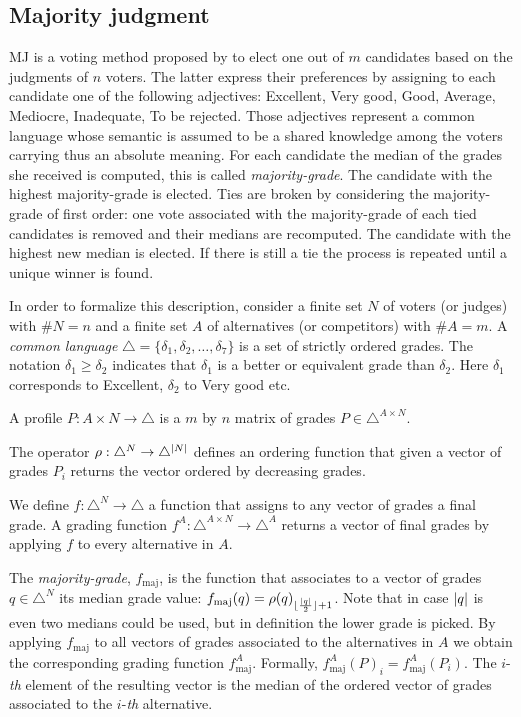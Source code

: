 
\subsection*{Majority judgment}
	\label{sec:MJ}
	\ac{MJ} is a voting method proposed by \citet{Balinski2007,Balinski2011} to elect one out of $m$ candidates based on the judgments of $n$ voters. The latter express their preferences by assigning to each candidate one of the following adjectives: Excellent, Very good, Good, Average, Mediocre, Inadequate, To be rejected. Those adjectives represent a common language whose semantic is assumed to be a shared knowledge among the voters carrying thus an absolute meaning. For each candidate the median of the grades she received is computed, this is called \textit{majority-grade}. The candidate with the highest majority-grade is elected. Ties are broken by considering the majority-grade of first order: one vote associated with the majority-grade of each tied candidates is removed and their medians are recomputed. The candidate with the highest new median is elected. If there is still a tie the process is repeated until a unique winner is found.
	
	In order to formalize this description, consider a finite set $N$ of voters (or judges) with $\#N=n$ and a finite set $A$ of alternatives (or competitors) with $\#A=m$. 
	A \textit{common language} $\triangle = \{ \delta_1, \delta_2, \dots , \delta_7\}$ is a set of strictly ordered grades. The notation $\delta_1 \geq \delta_2$ indicates that $\delta_1$ is a better or equivalent grade than $\delta_2$. Here $\delta_1$ corresponds to Excellent, $\delta_2$ to Very good etc.
	
	A profile $P : A\times N \rightarrow \triangle$ is a $m$ by $n$ matrix of grades $P \in \triangle^{A \times N}$.
	
	The operator $\rho: \triangle^{N} \rightarrow \triangle^{\lvert N\rvert}$ defines an ordering function that given a vector of grades $P_i$ returns the vector ordered by decreasing grades.
	
	We define $f: \triangle^{N} \rightarrow \triangle$ a function that assigns to any vector of grades a final grade. A grading function $f^A: \triangle^{A \times N} \rightarrow \triangle^A$ returns a vector of final grades by applying $f$ to every alternative in $A$.
	
	The \emph{majority-grade}, $f_\text{maj}$, is the function that associates to a vector of grades $q \in \triangle^{N}$ its median grade value: $f_\text{maj}(q) = \rho(q)_{\lfloor\frac{\lvert q\rvert}{2}\rfloor + 1}$. Note that in case $\lvert q\rvert$ is even two medians could be used, but in \citet{Balinski2011} definition the lower grade is picked. By applying $f_\text{maj}$ to all vectors of grades associated to the alternatives in $A$ we obtain the corresponding grading function $f^A_\text{maj}$. Formally, $f^A_\text{maj}(P)_i = f^A_\text{maj}(P_i)$. The $i$-\emph{th} element of the resulting vector is the median of the ordered vector of grades associated to the $i$-\emph{th} alternative. 
	
